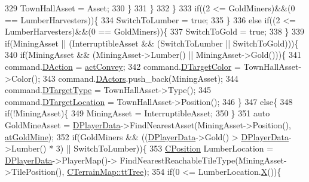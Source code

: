 \begin{DoxyCode}
329                 TownHallAsset = Asset;
330             \}
331         \}
332     \}
333     \textcolor{keywordflow}{if}((2 <= GoldMiners)&&(0 == LumberHarvesters))\{
334         SwitchToLumber = \textcolor{keyword}{true}; 
335     \}
336     \textcolor{keywordflow}{else} \textcolor{keywordflow}{if}((2 <= LumberHarvesters)&&(0 == GoldMiners))\{
337         SwitchToGold = \textcolor{keyword}{true}; 
338     \}
339     \textcolor{keywordflow}{if}(MiningAsset || (InterruptibleAsset && (SwitchToLumber || SwitchToGold)))\{
340         \textcolor{keywordflow}{if}(MiningAsset && (MiningAsset->Lumber() || MiningAsset->Gold()))\{
341             command.\hyperlink{structSPlayerCommandRequest_a80897bbccf2c4e0b148a7aa815a926c6}{DAction} = \hyperlink{GameDataTypes_8h_a35b98ce26aca678b03c6f9f76e4778cead52ccba78becf1f7411bcea19f1276a8}{actConvey};
342             command.\hyperlink{structSPlayerCommandRequest_a3690a5117efe6214d92f18d672b5714f}{DTargetColor} = TownHallAsset->Color();
343             command.\hyperlink{structSPlayerCommandRequest_aa37fc01519676345703d78b9f573894a}{DActors}.push\_back(MiningAsset);
344             command.\hyperlink{structSPlayerCommandRequest_a864e47c641127665751091876a6d3c5e}{DTargetType} = TownHallAsset->Type();
345             command.\hyperlink{structSPlayerCommandRequest_a701702b94ca2fd2738e95ef6711dd41a}{DTargetLocation} = TownHallAsset->Position();
346         \}
347         \textcolor{keywordflow}{else}\{
348             \textcolor{keywordflow}{if}(!MiningAsset)\{
349                 MiningAsset = InterruptibleAsset;   
350             \}
351             \textcolor{keyword}{auto} GoldMineAsset = \hyperlink{classCAIPlayer_a83b5113c8f7e80df54940b647c5ee2e6}{DPlayerData}->FindNearestAsset(MiningAsset->Position(), 
      \hyperlink{GameDataTypes_8h_a5600d4fc433b83300308921974477feca243d9ba44092eadd561db058d742b3b3}{atGoldMine});
352             \textcolor{keywordflow}{if}(GoldMiners && ((\hyperlink{classCAIPlayer_a83b5113c8f7e80df54940b647c5ee2e6}{DPlayerData}->Gold() > \hyperlink{classCAIPlayer_a83b5113c8f7e80df54940b647c5ee2e6}{DPlayerData}->Lumber() * 3) || 
      SwitchToLumber))\{
353                 \hyperlink{classCPosition}{CPosition} LumberLocation = \hyperlink{classCAIPlayer_a83b5113c8f7e80df54940b647c5ee2e6}{DPlayerData}->PlayerMap()->
      FindNearestReachableTileType(MiningAsset->TilePosition(), \hyperlink{classCTerrainMap_aff2ab991e237269941416dd79d8871d4a15600fc22dc08ff5a3aec20930112f8c}{CTerrainMap::ttTree});
354                 \textcolor{keywordflow}{if}(0 <= LumberLocation.\hyperlink{classCPosition_a9a6b94d3b91df1492d166d9964c865fc}{X}())\{

\end{DoxyCode}
